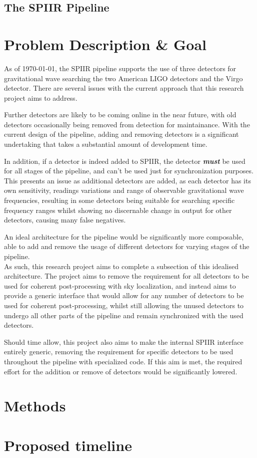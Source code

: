 \documentclass{article}
\begin{document}
\subsection{The SPIIR Pipeline}

\section{Problem Description \& Goal}
As of \today{}, the SPIIR pipeline supports the use of three detectors for gravitational wave
searching \textendash{} the two American LIGO detectors and the Virgo detector. There are several
issues with the current approach that this research project aims to address.

Further detectors are likely to be coming online in the near future, with old detectors occasionally
being removed from detection for maintainance. With the current design of the pipeline, adding and
removing detectors is a significant undertaking that takes a substantial amount of development time.

In addition, if a detector is indeed added to SPIIR, the detector \textit{\textbf{must}} be used for
all stages of the pipeline, and can't be used just for synchronization purposes. This presents an
issue as additional detectors are added, as each detector has its own sensitivity, readings
variations and range of observable gravitational wave frequencies, resulting in some detectors being
suitable for searching specific frequency ranges whilst showing no discernable change in output for
other detectors, causing many false negatives.

An ideal architecture for the pipeline would be significantly more composable, able to add and
remove the usage of different detectors for varying stages of the pipeline.
\\

As such, this research project aims to complete a subsection of this idealised architecture. The
project aims to remove the requirement for all detectors to be used for coherent post-processing
with sky localization, and instead aims to provide a generic interface that would allow for any
number of detectors to be used for coherent post-processing, whilst still allowing the unused
detectors to undergo all other parts of the pipeline and remain synchronized with the used
detectors.

Should time allow, this project also aims to make the internal SPIIR interface entirely generic,
removing the requirement for specific detectors to be used throughout the pipeline with specialized
code. If this aim is met, the required effort for the addition or remove of detectors would be
significantly lowered.

\section{Methods}
\section{Proposed timeline}
\end{document}

